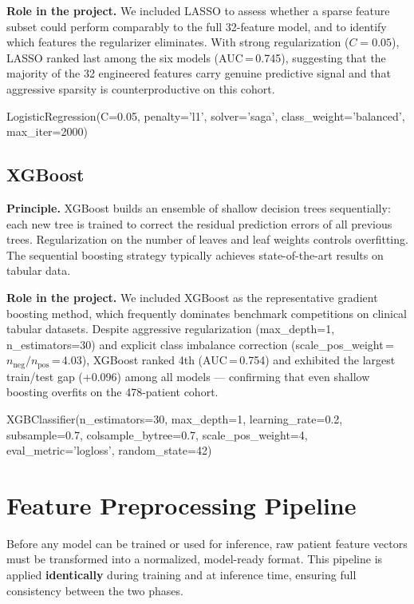 \documentclass[12pt,a4paper,twoside]{report}
\newcommand{\config}[1]{%
  \vspace{6pt}%
  \noindent\begin{tcolorbox}[
    enhanced, breakable,
    colback=platbg,
    colframe=primary!50,
    boxrule=0.6pt,
    arc=5pt,
    left=10pt, right=8pt, top=4pt, bottom=5pt,
    toptitle=3pt, bottomtitle=3pt,
    fontupper=\ttfamily\footnotesize\color{navydark},
    title={\footnotesize\bfseries Configuration},
    coltitle=white,
    colbacktitle=primary,
    titlerule=0pt
  ]
  #1
  \end{tcolorbox}%
  \vspace{4pt}%
}
\begin{document}
\textbf{Role in the project.} We included LASSO to assess whether a sparse feature subset could perform comparably to the full 32-feature model, and to identify which features the regularizer eliminates. With strong regularization ($C=0.05$), LASSO ranked last among the six models (AUC\,=\,0.745), suggesting that the majority of the 32 engineered features carry genuine predictive signal and that aggressive sparsity is counterproductive on this cohort.

\config{LogisticRegression(C=0.05, penalty='l1', solver='saga', class\_weight='balanced', max\_iter=2000)}

\subsection{XGBoost}

\textbf{Principle.} XGBoost \cite{chen_xgboost_2016} builds an ensemble of shallow decision trees sequentially: each new tree is trained to correct the residual prediction errors of all previous trees. Regularization on the number of leaves and leaf weights controls overfitting. The sequential boosting strategy typically achieves state-of-the-art results on tabular data.

\textbf{Role in the project.} We included XGBoost as the representative gradient boosting method, which frequently dominates benchmark competitions on clinical tabular datasets. Despite aggressive regularization (max\_depth=1, n\_estimators=30) and explicit class imbalance correction (scale\_pos\_weight\,=\,$n_{\text{neg}}/n_{\text{pos}}$\,=\,4.03), XGBoost ranked 4th (AUC\,=\,0.754) and exhibited the largest train/test gap (+0.096) among all models — confirming that even shallow boosting overfits on the 478-patient cohort.

\config{XGBClassifier(n\_estimators=30, max\_depth=1, learning\_rate=0.2, subsample=0.7, colsample\_bytree=0.7, scale\_pos\_weight=4, eval\_metric='logloss', random\_state=42)}

\section{Feature Preprocessing Pipeline}\label{sec:dyn_pipeline}

Before any model can be trained or used for inference, raw patient feature vectors must be transformed into a normalized, model-ready format. This pipeline is applied \textbf{identically} during training and at inference time, ensuring full consistency between the two phases.
\end{document}
